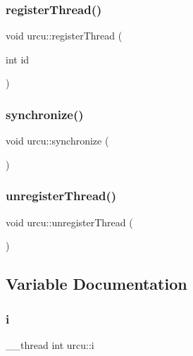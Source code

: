 \mbox{\label{namespaceurcu_a49bcb7fc416b2a8a251c8d33cf5a360e}} 
\subsubsection{\texorpdfstring{register\+Thread()}{registerThread()}}
{\footnotesize\ttfamily void urcu\+::register\+Thread (\begin{DoxyParamCaption}\item[{int}]{id }\end{DoxyParamCaption})}

\mbox{\label{namespaceurcu_a92fb7548f9a8dbd5e1d8a4dbfb79cfdc}} 
\subsubsection{\texorpdfstring{synchronize()}{synchronize()}}
{\footnotesize\ttfamily void urcu\+::synchronize (\begin{DoxyParamCaption}{ }\end{DoxyParamCaption})}

\mbox{\label{namespaceurcu_a05c52d5621cdd270fae5652f85bde20b}} 
\subsubsection{\texorpdfstring{unregister\+Thread()}{unregisterThread()}}
{\footnotesize\ttfamily void urcu\+::unregister\+Thread (\begin{DoxyParamCaption}{ }\end{DoxyParamCaption})}



\subsection{Variable Documentation}
\mbox{\label{namespaceurcu_a536341e353c82c078bc510ca0144dd58}} 
\subsubsection{\texorpdfstring{i}{i}}
{\footnotesize\ttfamily \+\_\+\+\_\+thread int urcu\+::i}

